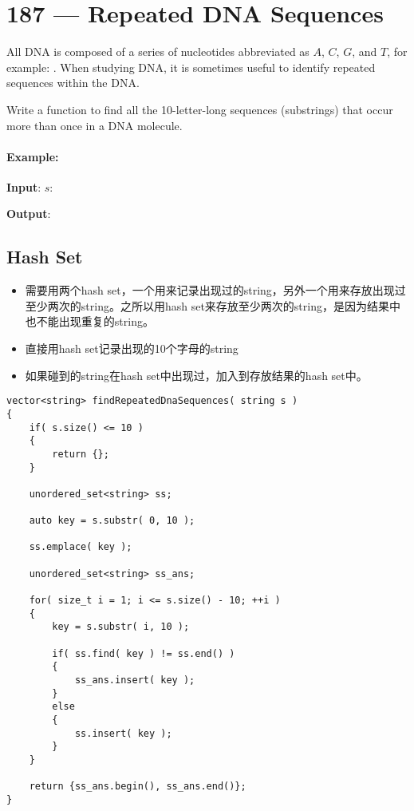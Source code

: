 \section{187 --- Repeated DNA Sequences}
All DNA is composed of a series of nucleotides abbreviated as $A$, $C$, $G$, and $T$, for example: . When studying DNA, it is sometimes useful to identify repeated sequences within the DNA.
\par
Write a function to find all the 10-letter-long sequences (substrings) that occur more than once in a DNA molecule.
\paragraph{Example:}
\begin{flushleft}
\textbf{Input}: $s$: 

\textbf{Output}: 
\end{flushleft}

\subsection{Hash Set}
\begin{itemize}
\item 需要用两个hash set，一个用来记录出现过的string，另外一个用来存放出现过至少两次的string。之所以用hash set来存放至少两次的string，是因为结果中也不能出现重复的string。
\item 直接用hash set记录出现的10个字母的string
\item 如果碰到的string在hash set中出现过，加入到存放结果的hash set中。
\end{itemize}
\setcounter{lstlisting}{0}
\begin{lstlisting}[style=customc, caption={Hash Sets}]
vector<string> findRepeatedDnaSequences( string s )
{
    if( s.size() <= 10 )
    {
        return {};
    }

    unordered_set<string> ss;

    auto key = s.substr( 0, 10 );

    ss.emplace( key );

    unordered_set<string> ss_ans;

    for( size_t i = 1; i <= s.size() - 10; ++i )
    {
        key = s.substr( i, 10 );

        if( ss.find( key ) != ss.end() )
        {
            ss_ans.insert( key );
        }
        else
        {
            ss.insert( key );
        }
    }

    return {ss_ans.begin(), ss_ans.end()};
}
\end{lstlisting}

